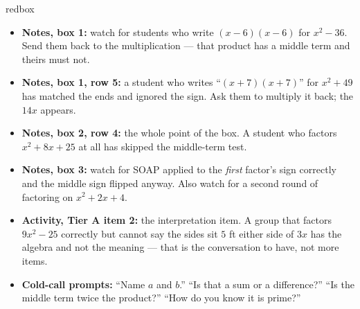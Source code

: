 \documentclass[10pt]{article}
\begin{document}
\begin{skillbox}{redbox}
\begin{itemize}[leftmargin=1.2em, itemsep=2pt, topsep=2pt]
  \item \textbf{Notes, box 1:} watch for students who write $(x-6)(x-6)$ for $x^2-36$. Send them
        back to the multiplication --- that product has a middle term and theirs must not.
  \item \textbf{Notes, box 1, row 5:} a student who writes ``$(x+7)(x+7)$'' for $x^2+49$ has
        matched the ends and ignored the sign. Ask them to multiply it back; the $14x$ appears.
  \item \textbf{Notes, box 2, row 4:} the whole point of the box. A student who factors
        $x^2+8x+25$ at all has skipped the middle-term test.
  \item \textbf{Notes, box 3:} watch for SOAP applied to the \emph{first} factor's sign correctly
        and the middle sign flipped anyway. Also watch for a second round of factoring on
        $x^2+2x+4$.
  \item \textbf{Activity, Tier A item 2:} the interpretation item. A group that factors $9x^2-25$
        correctly but cannot say the sides sit $5$ ft either side of $3x$ has the algebra and not
        the meaning --- that is the conversation to have, not more items.
  \item \textbf{Cold-call prompts:} ``Name $a$ and $b$.'' ``Is that a sum or a difference?''
        ``Is the middle term twice the product?'' ``How do you know it is prime?''
\end{itemize}
\end{skillbox}
\end{document}
